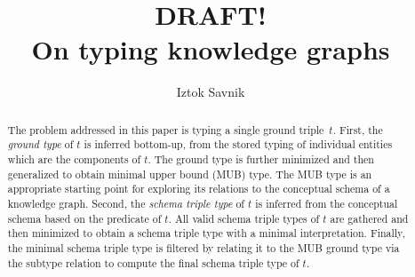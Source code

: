 \documentclass[runningheads]{llncs}
\newcommand{\memo}[1]{}
\begin{document}
\title{DRAFT! \\ On typing knowledge graphs}

\author{Iztok Savnik} 



\maketitle

\begin{abstract}
  The problem addressed in this paper is typing a single ground
  triple~$t$. First, the \emph{ground type} of $t$ is inferred
  bottom-up, from the stored typing of individual entities which are
  the components of $t$. The ground type is further minimized and then
  generalized to obtain minimal upper bound (MUB) type. The MUB type
  is an appropriate starting point for exploring its relations to the
  conceptual schema of a knowledge graph. Second, the \emph{schema
    triple type} of $t$ is inferred from the conceptual schema based
  on the predicate of $t$. All valid schema triple types of $t$ are
  gathered and then minimized to obtain a schema triple type with a
  minimal interpretation. Finally, the minimal schema triple type is
  filtered by relating it to the MUB ground type via the subtype
  relation to compute the final schema triple type of $t$.
  
\end{abstract}

\memo{
  Version 1.
  The problem addressed in this paper is typing a single ground triple
  $t$. The \emph{ground type} of a triple is
  inferred first from the stored typing of individual entities which
  are the components of $t$. The ground type is further minimized, to
  include solely the unrelated and minimal types of $t$'s
  components. The minimal ground type is then genralized to obtain minimal
  upper bound (MUB) type which is an appropriate starting point for
  exploring its relations to the conceptual schema of a KG. All valid
  candidates for the \emph{schema triple type} of $t$ are gathered and
  then minimized to obtain the schema triple type with a minimal
  interpretation. Finally, the minimal schema triple type is related
  to the MUB ground type via the subtype relation to compute the final
  schema triple type of $t$.
}
\end{document}
